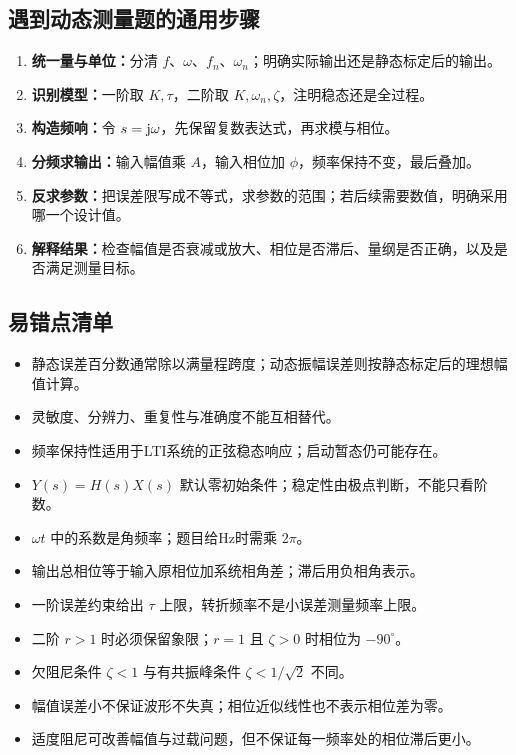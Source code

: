\subsection*{遇到动态测量题的通用步骤}
\begin{enumerate}
\item \textbf{统一量与单位：}分清 $f$、$\omega$、$f_n$、$\omega_n$；明确实际输出还是静态标定后的输出。
\item \textbf{识别模型：}一阶取 $K,\tau$，二阶取 $K,\omega_n,\zeta$，注明稳态还是全过程。
\item \textbf{构造频响：}令 $s=\mathrm{j}\omega$，先保留复数表达式，再求模与相位。
\item \textbf{分频求输出：}输入幅值乘 $A$，输入相位加 $\phi$，频率保持不变，最后叠加。
\item \textbf{反求参数：}把误差限写成不等式，求参数的范围；若后续需要数值，明确采用哪一个设计值。
\item \textbf{解释结果：}检查幅值是否衰减或放大、相位是否滞后、量纲是否正确，以及是否满足测量目标。
\end{enumerate}

\Needspace{7cm}
\subsection*{易错点清单}
\begin{itemize}
\item 静态误差百分数通常除以满量程跨度；动态振幅误差则按静态标定后的理想幅值计算。
\item 灵敏度、分辨力、重复性与准确度不能互相替代。
\item 频率保持性适用于LTI系统的正弦稳态响应；启动暂态仍可能存在。
\item $Y(s)=H(s)X(s)$ 默认零初始条件；稳定性由极点判断，不能只看阶数。
\item $\omega t$ 中的系数是角频率；题目给Hz时需乘 $2\pi$。
\item 输出总相位等于输入原相位加系统相角差；滞后用负相角表示。
\item 一阶误差约束给出 $\tau$ 上限，转折频率不是小误差测量频率上限。
\item 二阶 $r>1$ 时必须保留象限；$r=1$ 且 $\zeta>0$ 时相位为 $-90^\circ$。
\item 欠阻尼条件 $\zeta<1$ 与有共振峰条件 $\zeta<1/\sqrt2$ 不同。
\item 幅值误差小不保证波形不失真；相位近似线性也不表示相位差为零。
\item 适度阻尼可改善幅值与过载问题，但不保证每一频率处的相位滞后更小。
\end{itemize}

